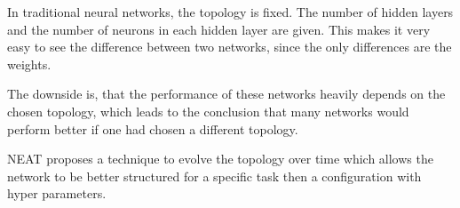 In traditional neural networks, the topology is fixed. The number of hidden layers and the number of neurons in each hidden layer are given. This makes it very easy to see the difference between two networks, since the only differences are the weights.

The downside is, that the performance of these networks heavily depends on the chosen topology, which leads to the conclusion that many networks would perform better if one had chosen a different topology.

NEAT proposes a technique to evolve the topology over time which allows the network to be better structured for a specific task then a configuration with hyper parameters.

